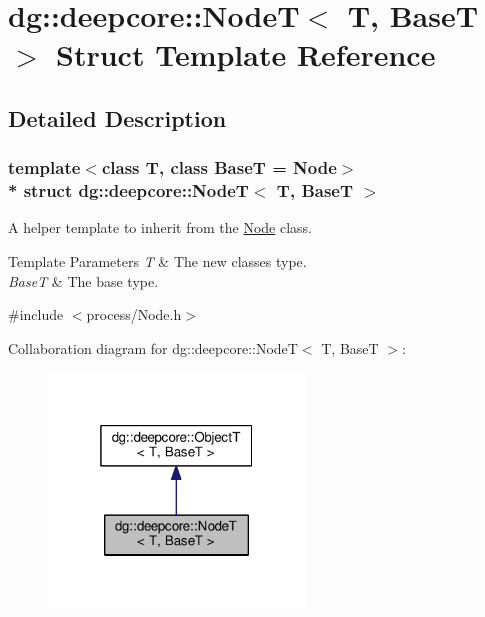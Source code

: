 \hypertarget{structdg_1_1deepcore_1_1_node_t}{}\section{dg\+:\+:deepcore\+:\+:NodeT$<$ T, BaseT $>$ Struct Template Reference}
\label{structdg_1_1deepcore_1_1_node_t}


\subsection{Detailed Description}
\subsubsection*{template$<$class T, class BaseT = Node$>$\\*
struct dg\+::deepcore\+::\+Node\+T$<$ T, Base\+T $>$}

A helper template to inherit from the \hyperlink{classdg_1_1deepcore_1_1_node}{Node} class. 


\begin{DoxyTemplParams}{Template Parameters}
{\em T} & The new class\textquotesingle{}es type. \\
\hline
{\em BaseT} & The base type. \\
\hline
\end{DoxyTemplParams}


{\ttfamily \#include $<$process/\+Node.\+h$>$}



Collaboration diagram for dg\+:\+:deepcore\+:\+:NodeT$<$ T, BaseT $>$\+:
\nopagebreak
\begin{figure}[H]
\begin{center}
\leavevmode
\includegraphics[width=193pt]{structdg_1_1deepcore_1_1_node_t__coll__graph}
\end{center}
\end{figure}
